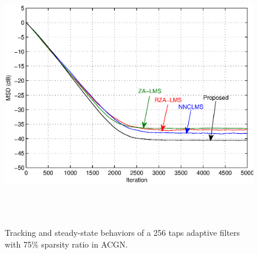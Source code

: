 


\begin{figure}[!htb]
\begin{center}
\vspace{1cm}
\includegraphics[width=14.25cm, height=11cm]{Figures/Chapter5/fig13.eps}\\
\end{center}
\vspace{-1cm}
\caption{Tracking and steady-state behaviors of a 256 taps adaptive filters with 75\% sparsity ratio in ACGN.}
\label{fig11}
\vspace{1.5cm}
\end{figure}


